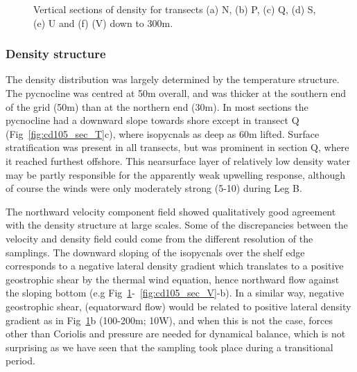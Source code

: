 \begin{figure}[!th]
\centering {}%
 
 
\caption{Vertical sections of
density for transects (a) N, (b) P, (c) Q, (d) S, (e) U and (f)
(V) down to 300m.} \label{fig:cd105_sec_D}\end{figure}

\subsubsection{Density structure}
The density distribution was largely determined by the temperature
structure. The pycnocline was centred at 50m overall, and was
thicker at the southern end of the grid (50m) than at the northern
end (30m). In most sections the pycnocline had a downward slope
towards shore except in transect Q (Fig~\ref{fig:cd105_sec_T}c),
where isopycnals as deep as 60m lifted. Surface stratification was
present in all transects, but was prominent in section Q, where it
reached furthest offshore. This nearsurface layer of relatively
low density water may be partly responsible for the apparently
weak upwelling response, although of course the winds were only
moderately strong (5-10\vel) during Leg B.

The northward velocity component field showed qualitatively good
agreement with the density structure at large scales. Some of the
discrepancies between the velocity and density field could come
from the different resolution of the samplings. The downward
sloping of the isopycnals over the shelf edge corresponds to a
negative lateral density gradient which translates to a positive
geostrophic shear by the thermal wind equation, hence northward
flow against the sloping bottom (e.g
Fig~\ref{fig:cd105_sec_D}-~\ref{fig:cd105_sec_V}-b). In a similar
way, negative geostrophic shear, (equatorward flow) would be
related to positive lateral density gradient as in
Fig~\ref{fig:cd105_sec_D}b (100-200m; 10\deg W), and when
this is not the case, forces other than Coriolis and pressure are
needed for dynamical balance, which is not surprising as we have
seen that the sampling took place during a transitional period.
